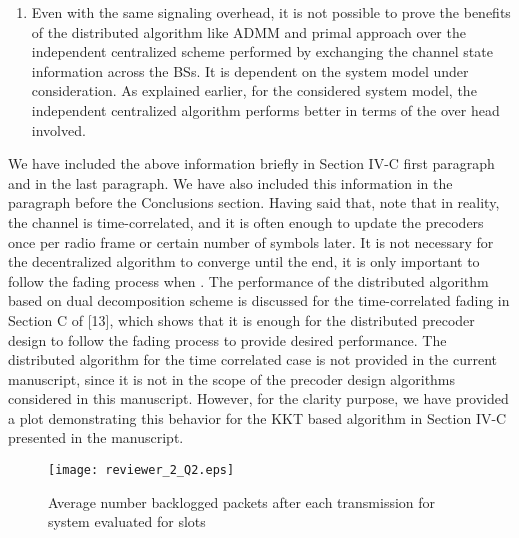 \begin{enumerate}
\begin{enumerate}
		\item Even with the same signaling overhead, it is not possible to prove the benefits of the distributed algorithm like \ac{ADMM} and primal approach over the independent centralized scheme performed by exchanging the channel state information across the \acp{BS}. It is dependent on the system model under consideration. As explained earlier, for the considered system model, the independent centralized algorithm performs better in terms of the over head involved. 
	\end{enumerate}
	
	We have included the above information briefly in Section IV-C first paragraph and in the last paragraph. We have also included this information in the paragraph before the Conclusions section. Having said that, note that in reality, the channel is time-correlated, and it is often enough to update the precoders once per radio frame or certain number of symbols later. It is not necessary for the decentralized algorithm to converge until the end, it is only important to follow the fading process when . The performance of the distributed algorithm based on dual decomposition scheme is discussed for the time-correlated fading in Section C of [13], which shows that it is enough for the distributed precoder design to follow the fading process to provide desired performance. The distributed algorithm for the time correlated case is not provided in the current manuscript, since it is not in the scope of the precoder design algorithms considered in this manuscript. However, for the clarity purpose, we have provided a plot demonstrating this behavior for the \ac{KKT} based algorithm in Section IV-C presented in the manuscript.
	\begin{figure}[h!]
		\centering
		\texttt{[image: reviewer\_2\_Q2.eps]}
		\caption{Average number backlogged packets after each transmission for system  evaluated for  slots}
		\label{fig-review-2}
	\end{figure}
		

\end{enumerate}
